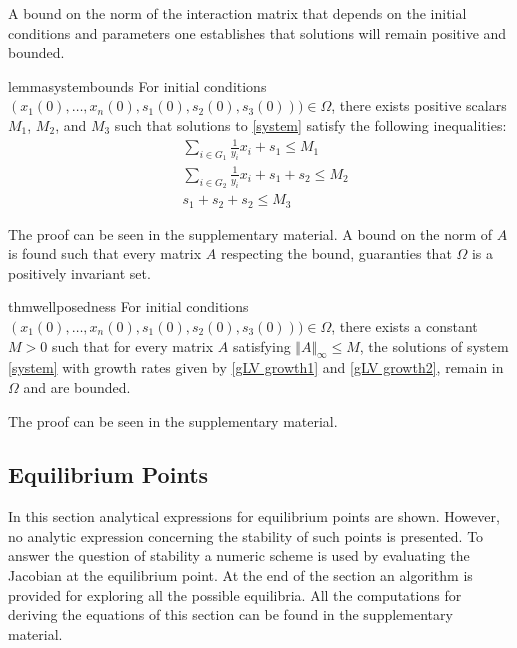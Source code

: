 \documentclass[3p,times]{article}
\begin{document}
A bound on the norm of the interaction matrix that depends on the initial conditions and parameters one establishes that solutions will remain positive and bounded. 

\begin{restatable}{lemma}{systembounds}
	\label{l1}
	For initial conditions $(x_1(0),\dots,x_n(0),s_1(0),s_2(0),s_3(0)))\in \Omega$, there exists positive scalars $M_1$, $M_2$, and $M_3$ such that solutions to \eqref{system} satisfy the following inequalities:
	\begin{align}
	&\sum \limits_{i \in G_1} \frac{1}{y_i}x_i + s_1 \leq M_1 \\
	&\sum \limits_{i \in G_2} \frac{1}{y_i}x_i + s_1 +s_2 \leq M_2 \\
	&s_1 + s_2 + s_2 \leq M_3
	\end{align}
\end{restatable}

The proof can be seen in the supplementary material. A bound on the norm of $A$ is found such that every matrix $A$ respecting the bound, guaranties that $\Omega$ is a positively invariant set.

\begin{restatable}{thm}{wellposedness}
	\label{theoWellPosedness}
	For initial conditions $(x_1(0),\dots,x_n(0),s_1(0),s_2(0),s_3(0)))\in \Omega$, there exists a constant $M>0$ such that for every matrix $A$ satisfying $\Vert A \Vert_{\infty} \leq M $, the solutions of system \eqref{system} with growth rates given by \eqref{gLV growth1} and \eqref{gLV growth2}, remain in $\Omega$ and are bounded.
\end{restatable}

The proof can be seen in the supplementary material.

\subsection{Equilibrium Points}

In this section analytical expressions for equilibrium points are shown. However, no analytic expression concerning the stability of such points is presented. To answer the question of stability a numeric scheme is used by evaluating the Jacobian at the equilibrium point. At the end of the section an algorithm is provided for exploring all the possible equilibria. All the computations for deriving the equations of this section can be found in the supplementary material.
\end{document}
